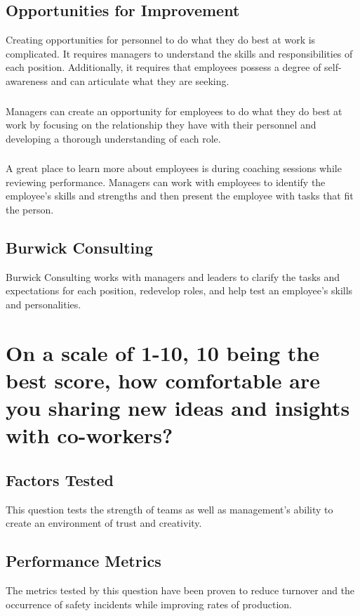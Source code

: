 \documentclass[14pt]{extreport}
\begin{document}
\subsection*{\centering Opportunities for Improvement}
Creating opportunities for personnel to do what they do best at work is complicated. It requires managers to understand the skills and responsibilities of each position. Additionally, it requires that employees possess a degree of self-awareness and can articulate what they are seeking.
\subsubsection*{}
Managers can create an opportunity for employees to do what they do
best at work by focusing on the relationship they have with their
personnel and developing a thorough understanding of each role.
\subsubsection*{}
A great place to learn more about employees is during coaching sessions
while reviewing performance. Managers can work with employees to
identify the employee's skills and strengths and then present the employee with tasks that fit the person.

\subsection*{\centering Burwick Consulting}
Burwick Consulting works with managers and leaders to clarify the tasks and expectations for each position, redevelop roles, and help test an employee’s skills and personalities. 

\newpage
\section*{On a scale of 1-10, 10 being the best score, how comfortable are you sharing new ideas and insights with co-workers?}

\subsection*{\centering Factors Tested}
This question tests the strength of teams as well as management's ability to create an environment of trust and creativity.
\subsection*{\centering Performance Metrics}
The metrics tested by this question have been proven to reduce
turnover and the occurrence of safety incidents while improving
rates of production.

\end{document}
